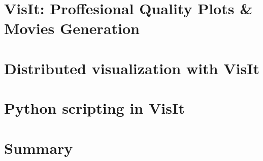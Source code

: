 \documentclass[xcolor=svgnames]{beamer}
\providecommand{\sectionpage}{\Large\centering \bf\mediumblue\insertsection}
\begin{document}
\section{VisIt: Proffesional Quality Plots \& Movies Generation}
\frame{\sectionpage}
  \usestructuretemplate{\color{structure}}{} 
 
\resetEnv

\section{Distributed visualization with VisIt}
\frame{\sectionpage}
  \usestructuretemplate{\color{structure}}{} 
 
\resetEnv

\section{Python scripting in VisIt}
\frame{\sectionpage}
  \usestructuretemplate{\color{structure}}{} 
 
\resetEnv

\section{Summary}
\frame{\sectionpage}
 
\end{document}
